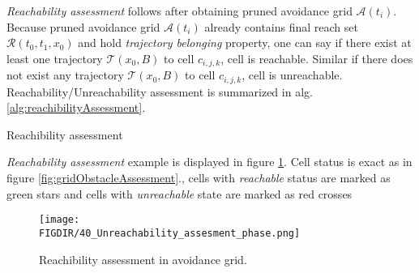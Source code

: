 \noindent\textit{Reachability assessment} follows after obtaining pruned avoidance grid $\mathscr{A}(t_i)$. Because pruned avoidance grid $\mathscr{A}(t_i)$ already contains final reach set $\mathscr{R}(t_0,t_1,x_0)$ and hold \textit{trajectory belonging} property, one can say if there exist at least one trajectory $\mathscr{T}(x_0,B)$ to cell $c_{i,j,k}$, cell is reachable. Similar if there does not exist any trajectory $\mathscr{T}(x_0,B)$ to cell $c_{i,j,k}$, cell is unreachable. Reachability/Unreachability assessment is summarized in alg. \ref{alg:reachibilityAssessment}.
\\
\begin{algorithm}[H]
    \caption{Reachibility assessment}
    \label{alg:reachibilityAssessment}
\end{algorithm}
\noindent\textit{Reachability assessment} example is displayed in figure \ref{fig:gridReachabilityAssessment}. Cell status is exact as in figure \ref{fig:gridObstacleAssessment}., cells with \textit{reachable} status are marked as green stars and cells with \textit{unreachable} state are marked as red crosses

\begin{figure}[H]
    \centering
    \texttt{[image: \\FIGDIR/40\_Unreachability\_assesment\_phase.png]}
    \caption{Reachibility assessment in avoidance grid.}
    \label{fig:gridReachabilityAssessment}
\end{figure}



